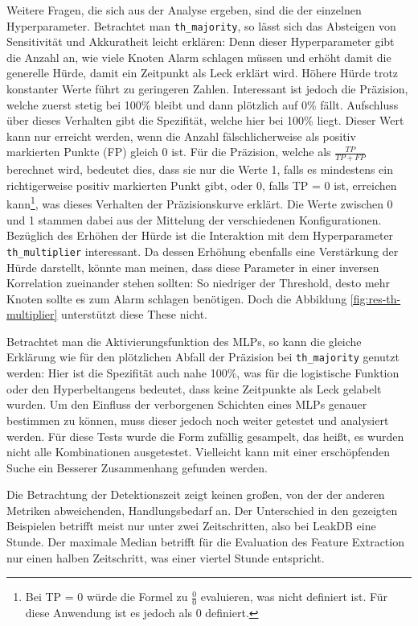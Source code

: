 Weitere Fragen, die sich aus der Analyse ergeben, sind die der einzelnen Hyperparameter. Betrachtet man
 \texttt{th\_majority}, so lässt sich das Absteigen von Sensitivität und Akkuratheit leicht erklären: Denn dieser
 Hyperparameter gibt die Anzahl an, wie viele Knoten Alarm schlagen müssen und erhöht damit die generelle Hürde,
 damit ein Zeitpunkt als Leck erklärt wird. Höhere Hürde trotz konstanter Werte führt zu geringeren Zahlen.
 Interessant ist jedoch die Präzision, welche zuerst stetig bei 100\% bleibt und dann plötzlich auf 0\%
 fällt. Aufschluss über dieses Verhalten gibt die Spezifität, welche hier bei 100\% liegt. Dieser Wert kann
 nur erreicht werden, wenn die Anzahl fälschlicherweise als positiv markierten Punkte (FP) gleich 0 ist.
 Für die Präzision, welche als $\frac{TP}{TP+FP}$ berechnet wird, bedeutet dies, dass sie nur die Werte 1, falls
 es mindestens ein richtigerweise positiv markierten Punkt gibt, oder 0, falls TP = 0 ist, erreichen
 kann\footnote{Bei TP = 0 würde die Formel zu $\frac{0}{0}$ evaluieren, was nicht definiert ist. Für diese Anwendung
 ist es jedoch als 0 definiert.}, was dieses Verhalten der Präzisionskurve erklärt. Die Werte zwischen 0 und 1
 stammen dabei aus der Mittelung der verschiedenen Konfigurationen. Bezüglich des Erhöhen der Hürde ist die
 Interaktion mit dem Hyperparameter \texttt{th\_multiplier} interessant. Da dessen Erhöhung ebenfalls eine
 Verstärkung der Hürde darstellt, könnte man meinen, dass diese Parameter in einer inversen Korrelation
 zueinander stehen sollten: So niedriger der Threshold, desto mehr Knoten sollte es zum Alarm schlagen
 benötigen. Doch die Abbildung \ref{fig:res-th-multiplier} unterstützt diese These nicht.

Betrachtet man die Aktivierungsfunktion des MLPs, so kann die gleiche Erklärung wie für den plötzlichen Abfall
 der Präzision bei \texttt{th\_majority} genutzt werden: Hier ist die Spezifität auch nahe 100\%, was für die
 logistische Funktion oder den Hyperbeltangens bedeutet, dass keine Zeitpunkte als Leck gelabelt wurden. Um
 den Einfluss der verborgenen Schichten eines MLPs genauer bestimmen zu können, muss dieser jedoch noch weiter
 getestet und analysiert werden. Für diese Tests wurde die Form zufällig gesampelt, das heißt, es wurden nicht
 alle Kombinationen ausgetestet. Vielleicht kann mit einer erschöpfenden Suche ein Besserer Zusammenhang
 gefunden werden.

Die Betrachtung der Detektionszeit zeigt keinen großen, von der der anderen Metriken abweichenden,
 Handlungsbedarf an. Der Unterschied in den gezeigten Beispielen betrifft meist nur unter zwei Zeitschritten,
 also bei LeakDB eine Stunde. Der maximale Median betrifft für die Evaluation des Feature Extraction nur einen
 halben Zeitschritt, was einer viertel Stunde entspricht.

